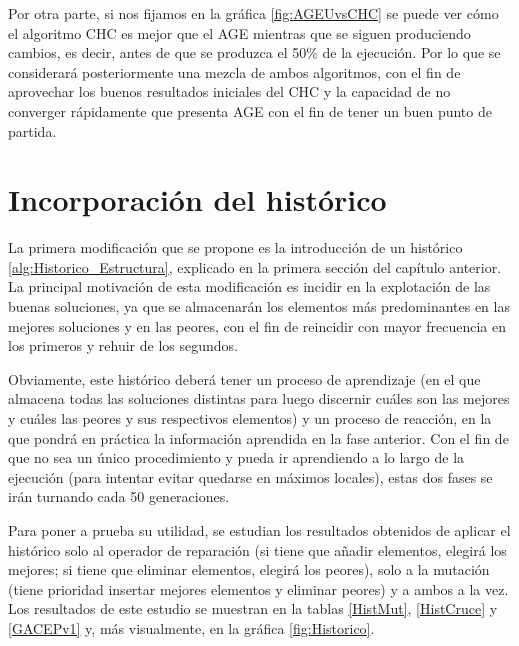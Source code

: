 Por otra parte, si nos fijamos en la gráfica \ref{fig:AGEUvsCHC} se puede ver cómo el algoritmo CHC es mejor que el AGE mientras que se siguen produciendo cambios, es decir, antes de que se produzca el 50\% de la ejecución. 
Por lo que se considerará posteriormente una mezcla de ambos algoritmos, con el fin de aprovechar los buenos resultados iniciales del CHC y la capacidad de no converger rápidamente que presenta AGE con el fin de tener un buen punto de partida.

\section{Incorporación del histórico}

La primera modificación que se propone es la introducción de un histórico \ref{alg:Historico_Estructura}, explicado en la primera sección del capítulo anterior. 
La principal motivación de esta modificación es incidir en la explotación de las buenas soluciones, ya que se almacenarán los elementos más predominantes en las mejores soluciones y en las peores, con el fin de reincidir con mayor frecuencia en los primeros y rehuir de los segundos. 

Obviamente, este histórico deberá tener un proceso de aprendizaje (en el que almacena todas las soluciones distintas para luego discernir cuáles son las mejores y cuáles las peores y sus respectivos elementos) y un proceso de reacción, en la que pondrá en práctica la información aprendida en la fase anterior. 
Con el fin de que no sea un único procedimiento y pueda ir aprendiendo a lo largo de la ejecución (para intentar evitar quedarse en máximos locales), estas dos fases se irán turnando cada 50 generaciones. 

Para poner a prueba su utilidad, se estudian los resultados obtenidos de aplicar el histórico solo al operador de reparación (si tiene que añadir elementos, elegirá los mejores; si tiene que eliminar elementos, elegirá los peores), solo a la mutación (tiene prioridad insertar mejores elementos y eliminar peores) y a ambos a la vez. 
Los resultados de este estudio se muestran en la tablas \ref{HistMut}, \ref{HistCruce} y \ref{GACEPv1} y, más visualmente, en la gráfica \ref{fig:Historico}.

